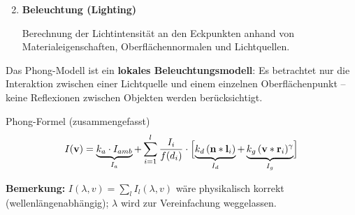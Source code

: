 \documentclass[12pt, a4paper]{article}
\begin{document}

\begin{enumerate}
  \setcounter{enumi}{1}

  \item \textbf{Beleuchtung (Lighting)}

  Berechnung der Lichtintensität an den Eckpunkten anhand von Materialeigenschaften, Oberflächennormalen und Lichtquellen.

\end{enumerate}


Das Phong-Modell ist ein \textbf{lokales Beleuchtungsmodell}: Es betrachtet nur die Interaktion zwischen einer Lichtquelle und einem einzelnen Oberflächenpunkt -- keine Reflexionen zwischen Objekten werden berücksichtigt.

\begin{definitionbox}{Phong-Formel (zusammengefasst)}
\[
  I(\mathbf{v}) = \underbrace{k_a \cdot I_{amb}}_{I_a}
  + \sum_{i=1}^{l} \frac{I_i}{f(d_i)} \cdot
  \Bigl[\underbrace{k_d\,(\mathbf{n} \ast \mathbf{l}_i)}_{I_d}
  + \underbrace{k_g\,(\mathbf{v} \ast \mathbf{r}_i)^{\gamma}}_{I_g}\Bigr]
\]
\end{definitionbox}

\textbf{Bemerkung:} $I(\lambda, v) = \sum_l I_l(\lambda, v)$ wäre physikalisch korrekt (wellenlängenabhängig); $\lambda$ wird zur Vereinfachung weggelassen.
\end{document}
